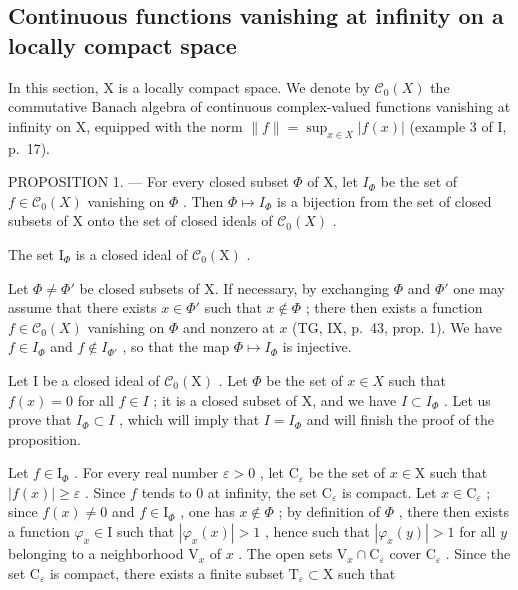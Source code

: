 \subsection{Continuous functions vanishing at infinity on a locally compact space}

In this section, X is a locally compact space. We denote by \(\mathcal{C}_{0}(X)\) the commutative Banach algebra of continuous complex-valued functions vanishing at infinity on X, equipped with the norm \(\|f\|=\sup_{x\in X}|f(x)|\) (example 3 of I, p.~17).

PROPOSITION 1. --- For every closed subset \(\Phi\) of X, let \(I_{\Phi}\) be the set of \(f \in \mathcal{C}_0(X)\) vanishing on \(\Phi\) . Then \(\Phi \mapsto I_{\Phi}\) is a bijection from the set of closed subsets of X onto the set of closed ideals of \(\mathcal{C}_0(X)\) .

The set \(\mathrm{I}_{\Phi}\) is a closed ideal of \(\mathcal{C}_0(\mathrm{X})\) .

Let \(\Phi \neq \Phi'\) be closed subsets of X. If necessary, by exchanging \(\Phi\) and \(\Phi'\) one may assume that there exists \(x \in \Phi'\) such that \(x \notin \Phi\) ; there then exists a function \(f \in \mathcal{C}_0(X)\) vanishing on \(\Phi\) and nonzero at \(x\) (TG, IX, p.~43, prop. 1). We have \(f \in I_{\Phi}\) and \(f \notin I_{\Phi'}\) , so that the map \(\Phi \mapsto I_{\Phi}\) is injective.

Let I be a closed ideal of \(\mathcal{C}_{0}(\mathrm{X})\) . Let \(\Phi\) be the set of \(x \in X\) such that \(f(x) = 0\) for all \(f \in I\) ; it is a closed subset of X, and we have \(I \subset I_{\Phi}\) . Let us prove that \(I_{\Phi} \subset I\) , which will imply that \(I = I_{\Phi}\) and will finish the proof of the proposition.

Let \(f \in \mathrm{I}_{\Phi}\) . For every real number \(\varepsilon > 0\) , let \(\mathrm{C}_{\varepsilon}\) be the set of \(x \in \mathrm{X}\) such that \(|f(x)| \geqslant \varepsilon\) . Since \(f\) tends to 0 at infinity, the set \(\mathrm{C}_{\varepsilon}\) is compact. Let \(x \in \mathrm{C}_{\varepsilon}\) ; since \(f(x) \neq 0\) and \(f \in \mathrm{I}_{\Phi}\) , one has \(x \notin \Phi\) ; by definition of \(\Phi\) , there then exists a function \(\varphi_x \in \mathrm{I}\) such that \(|\varphi_x(x)| > 1\) , hence such that \(|\varphi_x(y)| > 1\) for all \(y\) belonging to a neighborhood \(\mathrm{V}_x\) of \(x\) . The open sets \(\mathrm{V}_x \cap \mathrm{C}_{\varepsilon}\) cover \(\mathrm{C}_{\varepsilon}\) . Since the set \(\mathrm{C}_{\varepsilon}\) is compact, there exists a finite subset \(\mathrm{T}_{\varepsilon} \subset \mathrm{X}\) such that

